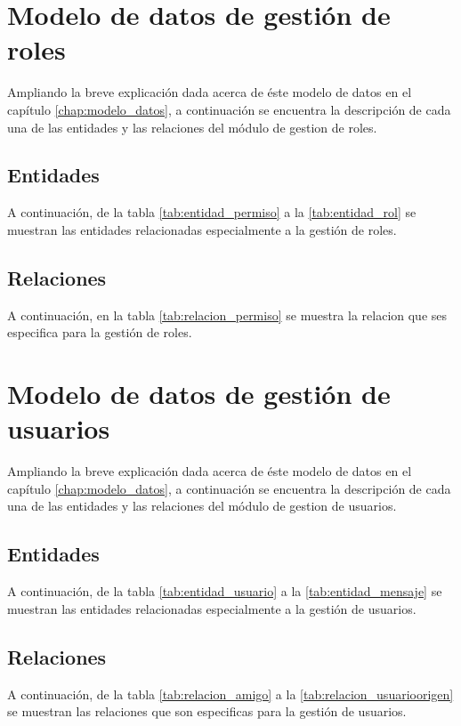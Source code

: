 \section{Modelo de datos de gestión de roles}
Ampliando la breve explicación dada acerca de éste modelo de datos en el capítulo \ref{chap:modelo_datos}, a continuación se encuentra la descripción de cada una de las entidades y las relaciones del módulo de gestion de roles.
\subsection{Entidades}
A continuación, de la tabla \ref{tab:entidad_permiso} a la \ref{tab:entidad_rol} se muestran las entidades relacionadas especialmente a la gestión de roles.


\subsection{Relaciones}
A continuación, en la tabla \ref{tab:relacion_permiso} se muestra la relacion que ses especifica para la gestión de roles.



\section{Modelo de datos de gestión de usuarios}
Ampliando la breve explicación dada acerca de éste modelo de datos en el capítulo \ref{chap:modelo_datos}, a continuación se encuentra la descripción de cada una de las entidades y las relaciones del módulo de gestion de usuarios.
\subsection{Entidades}
A continuación, de la tabla \ref{tab:entidad_usuario} a la \ref{tab:entidad_mensaje} se muestran las entidades relacionadas especialmente a la gestión de usuarios.




\subsection{Relaciones}
A continuación, de la tabla \ref{tab:relacion_amigo} a la \ref{tab:relacion_usuarioorigen} se muestran las relaciones que son especificas para la gestión de usuarios.




